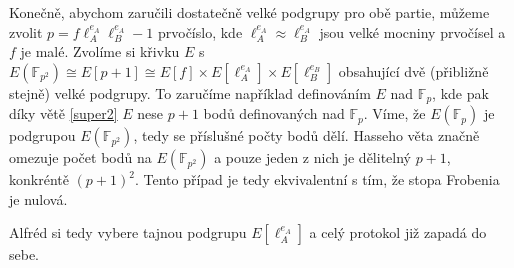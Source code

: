 \documentclass[12pt]{report}
\begin{document}
Konečně, abychom zaručili dostatečně velké podgrupy pro obě partie, můžeme zvolit $p = f \ell_A ^{e_A} \ell_B ^ {e_A} - 1$ prvočíslo, kde $\ell_A ^ {e_A} \approx \ell_B ^{e_A}$ jsou velké mocniny prvočísel a $f$ je malé. Zvolíme si křivku $E$ s $E(\mathbb{F}_{p^2}) \cong E[p+1] \cong E[f] \times E[\ell_A ^{e_A}] \times E[\ell_B ^{e_B}]$ obsahující dvě (přibližně stejně) velké podgrupy. To zaručíme například definováním $E$ nad $\mathbb{F}_p$, kde pak díky větě \ref{super2} $E$ nese $p+1$ bodů definovaných nad $\mathbb{F}_p$. Víme, že $E(\mathbb{F}_p)$ je podgrupou $E(\mathbb{F}_{p^2})$, tedy se příslušné počty bodů dělí. Hasseho věta značně omezuje počet bodů na $E(\mathbb{F}_{p^2})$ a pouze jeden z nich je dělitelný $p+1$, konkréntě $(p+1)^2$. Tento případ je tedy ekvivalentní s tím, že stopa Frobenia je nulová.

Alfréd si tedy vybere tajnou podgrupu $E[\ell_A ^{e_A}]$ a celý protokol již zapadá do sebe.
\end{document}

